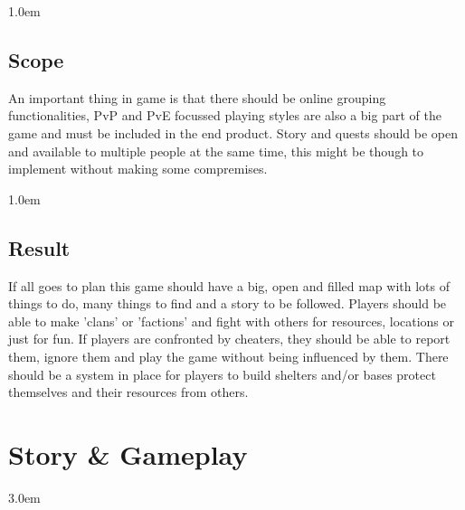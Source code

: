 \documentclass[a4paper]{report}
\newcounter{oldtocdepth}
\newcommand{\hidefromtoc}{%
  \setcounter{oldtocdepth}{\value{tocdepth}}%
  \addtocontents{toc}{\protect\setcounter{tocdepth}{-10}}%
}
\newcommand{\unhidefromtoc}{%
  \addtocontents{toc}{\protect\setcounter{tocdepth}{\value{oldtocdepth}}}%
  
  \renewcommand{\cftchapleader}{\cftdotfill{\cftdotsep}}
}
\begin{document}
\kern 1.0em

\hidefromtoc
\section *{Scope}
\unhidefromtoc


An important thing in game is that there should be online grouping functionalities, 
PvP and PvE focussed playing styles are also a big part of the game and must be included in the end product.
Story and quests should be open and available to multiple people at the same time, this might be though to implement without making some compremises.

\kern 1.0em

\hidefromtoc
\section *{Result}
\unhidefromtoc


If all goes to plan this game should have a big, open and filled map with lots of things to do, many things to find and a story to be followed. 
Players should be able to make 'clans' or 'factions' and fight with others for resources, locations or just for fun. 
If players are confronted by cheaters, they should be able to report them, ignore them and play the game without being influenced by them.
There should be a system in place for players to build shelters and/or bases protect themselves and their resources from others.

\hidefromtoc
\chapter *{Story \& Gameplay}
\unhidefromtoc


\kern 3.0em
\end{document}
